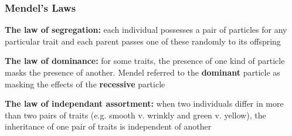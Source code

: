 \documentclass{beamer}
\begin{document}
\begin{frame}
	\frametitle{Mendel's Laws}
	\textbf{The law of segregation: } each individual possesses a pair of particles for any particular trait and each parent passes one of these randomly to its offspring \pause

	\vspace{10pt}

		\textbf{The law of dominance: } for some traits, the presence of one kind of particle masks the presence of another. Mendel referred to the \textbf{dominant} particle as masking the effects of the \textbf{recessive} particle \pause
		
	\vspace{10pt}
		
			\textbf{The law of independant assortment:} when two individuals differ in more than two pairs of traits (e.g. smooth v. wrinkly and green v. yellow), the inheritance of one pair of traits is independent of another 
		
\end{frame}
\end{document}
